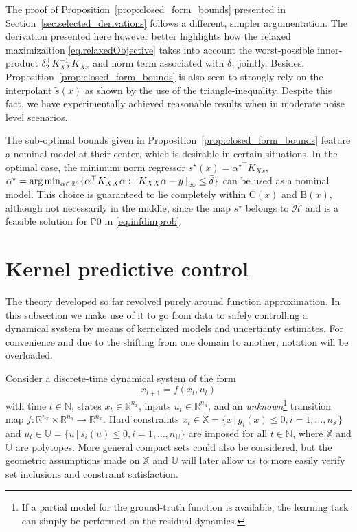 The proof of Proposition~\ref{prop:closed_form_bounds} presented in Section~\ref{sec.selected_derivations} follows a different, simpler argumentation. The derivation presented here however better highlights how the relaxed maximizaition \eqref{eq.relaxedObjective} takes into account the worst-possible inner-product $\delta_2^\top K_{XX}^{-1}K_{Xx}$ and norm term associated with $\delta_1$ jointly. Besides, Proposition~\ref{prop:closed_form_bounds} is also seen to strongly rely on the interpolant $\tilde s(x)$ as shown by the use of the triangle-inequality.  Despite this fact, we have experimentally achieved reasonable results when in moderate noise level scenarios.

\begin{remark}
	The sub-optimal bounds given in Proposition~\ref{prop:closed_form_bounds} feature a nominal model at their center, which is desirable in certain situations. In the optimal case, the minimum norm regressor $s^\star(x) = \alpha^{\star\top} K_{Xx}$, $\alpha^\star = \text{arg}\min_{\alpha \in \mathbb{R}^d} \{ \alpha^\top K_{XX} \alpha : \left\| K_{XX} \alpha - y \right\|_\infty \leq \bar\delta \}$ can be used as a nominal model. This choice is guaranteed to lie completely within $\text{C}(x)$ and $\text{B}(x)$, although not necessarily in the middle, since the map $s^\star$ belongs to $\mathcal{H}$ and is a feasible solution for $\mathds{P}0$ in \eqref{eq.infdimprob}.
\end{remark}

\section{Kernel predictive control}
\label{sec.kpc}

The theory developed so far revolved purely around function approximation. In this subsection we make use of it to go from data to safely controlling a dynamical system by means of kernelized models and uncertianty estimates. For convenience and due to the shifting from one domain to another, notation will be overloaded.

Consider a discrete-time dynamical system of the form 
\begin{equation}
	\label{eq.dyn_sys}
	x_{t+1} = f(x_t,u_t)	
\end{equation}
with time $t \in \mathbb{N}$, states $x_t \in \mathbb{R}^{n_x}$, inputs $u_t \in \mathbb{R}^{n_u}$, and an \textit{unknown}\footnote{If a partial model for the ground-truth function is available, the learning task can simply be performed on the residual dynamics.} transition map $f: \mathbb{R}^{n_x} \times \mathbb{R}^{n_u} \rightarrow \mathbb{R}^{n_x}$. Hard constraints $x_t \in \mathbb{X} = \{x \, | \, g_i(x) \leq 0, i=1,\dots,n_{\mathbb{X}}\}$ and $u_t \in \mathbb{U} = \{u \, | \, s_i(u) \leq 0, i=1,\dots,n_{\mathbb{U}}\}$ are imposed for all $t \in \mathbb{N}$, where $\mathbb{X}$ and $\mathbb{U}$ are polytopes. More general compact sets could also be considered, but the geometric assumptions made on $\mathbb{X}$ and $\mathbb{U}$ will later allow us to more easily verify set inclusions and constraint satisfaction.

